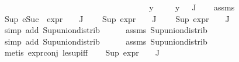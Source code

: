 \begin{isabellebody}
%
\isadelimproof
%
\endisadelimproof
%
\isatagproof
{}\isamarkupfalse%
\ \ \ \ \ \ \ \ \ \ \ \ \ \ \ \ \ \ \ \ \ \ \ \ \ \ \ \ \ \ \ \ \isanewline
\ \ \isamarkupfalse%
\ y\ \isanewline
\ \ \isamarkupfalse%
\ {\isachardoublequoteopen}y\ {\isasymin}{\isasymPhi}\ {\isacharbackquote}{\kern0pt}\ J{\isachardoublequoteclose}\isanewline
\ \ \isamarkupfalse%
\ assms\ \isamarkupfalse%
\ {\isachardoublequoteopen}Sup\ {\isacharparenleft}{\kern0pt}{\isacharparenleft}{\kern0pt}eSuc\ {\isasymcirc}\ expr{\isacharunderscore}{\kern0pt}{}\ {\isasymcirc}\ {\isasymPhi}{\isacharparenright}{\kern0pt}\ {\isacharbackquote}{\kern0pt}\ J{\isacharparenright}{\kern0pt}\ {\isasymle}\ {}{\isachardoublequoteclose}\isanewline
\ \ {\isachardoublequoteopen}Sup\ {\isacharparenleft}{\kern0pt}{\isacharparenleft}{\kern0pt}expr{\isacharunderscore}{\kern0pt}{}\ {\isasymcirc}\ {\isasymPhi}{\isacharparenright}{\kern0pt}\ {\isacharbackquote}{\kern0pt}\ J{\isacharparenright}{\kern0pt}\ {\isasymle}\ {}{\isachardoublequoteclose}\isanewline
\ \ {\isachardoublequoteopen}Sup\ {\isacharparenleft}{\kern0pt}{\isacharparenleft}{\kern0pt}expr{\isacharunderscore}{\kern0pt}{}\ {\isasymcirc}\ {\isasymPhi}{\isacharparenright}{\kern0pt}\ {\isacharbackquote}{\kern0pt}\ J{\isacharparenright}{\kern0pt}\ {\isasymle}\ {}{\isachardoublequoteclose}\isanewline
\ \ \ \ \ \ \isamarkupfalse%
\ {\isacharparenleft}{\kern0pt}simp\ add{\isacharcolon}{\kern0pt}\ Sup{\isacharunderscore}{\kern0pt}union{\isacharunderscore}{\kern0pt}distrib{\isacharparenright}{\kern0pt}\isanewline
\ \ \ \ \isamarkupfalse%
\ assms\ Sup{\isacharunderscore}{\kern0pt}union{\isacharunderscore}{\kern0pt}distrib\isanewline
\ \ \ \ \ \isamarkupfalse%
\ {\isacharparenleft}{\kern0pt}simp\ add{\isacharcolon}{\kern0pt}\ Sup{\isacharunderscore}{\kern0pt}union{\isacharunderscore}{\kern0pt}distrib{\isacharparenright}{\kern0pt}\isanewline
\ \ \ \ \isamarkupfalse%
\ assms\ Sup{\isacharunderscore}{\kern0pt}union{\isacharunderscore}{\kern0pt}distrib\isanewline
\ \ \ \ \isamarkupfalse%
\ {\isacharparenleft}{\kern0pt}metis\ expr{\isacharunderscore}{\kern0pt}{}{\isacharunderscore}{\kern0pt}conj\ le{\isacharunderscore}{\kern0pt}sup{\isacharunderscore}{\kern0pt}iff{\isacharparenright}{\kern0pt}\isanewline
\ \ \isamarkupfalse%
\ {\isachardoublequoteopen}Sup\ {\isacharparenleft}{\kern0pt}{\isacharparenleft}{\kern0pt}expr{\isacharunderscore}{\kern0pt}{}\ {\isasymcirc}\ {\isasymPhi}{\isacharparenright}{\kern0pt}\ {\isacharbackquote}{\kern0pt}\ J{\isacharparenright}{\kern0pt}\ {\isasymle}\ {}{\isachardoublequoteclose}\isanewline

\end{isabellebody}
